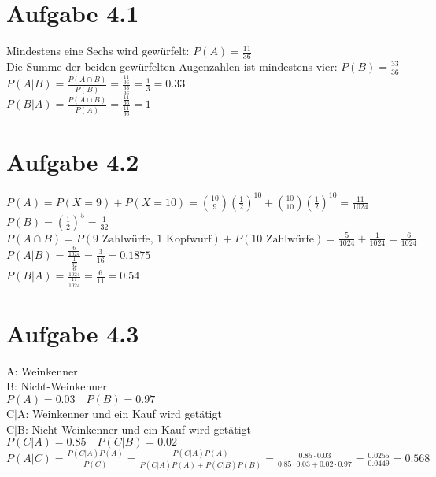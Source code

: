 \documentclass{article}
\begin{document}
	\section*{Aufgabe 4.1}
	Mindestens eine Sechs wird gewürfelt: $P(A) = \frac{11}{36}$ \\
	\newline
	Die Summe der beiden gewürfelten Augenzahlen ist mindestens vier: $P(B) = \frac{33}{36}$ \\
	\newline
	$P(A | B) = \frac{P(A \cap B)}{P(B)} = \frac{\frac{11}{36}}{\frac{33}{36}} = \frac{1}{3} = 0.33$ \\
	\newline
	$P(B | A) = \frac{P(A \cap B)}{P(A)} = \frac{\frac{11}{36}}{\frac{11}{36}} = 1$
	
	\section*{Aufgabe 4.2}
	$P(A) = P(X=9) + P(X=10) = \binom{10}{9}(\frac{1}{2})^{10} + \binom{10}{10}(\frac{1}{2})^{10} = \frac{11}{1024}$ \\
	\newline
	$P(B) = (\frac{1}{2})^5 = \frac{1}{32}$ \\
	\newline
	$P(A \cap B) = P(\text{9  Zahlwürfe, 1 Kopfwurf}) + P(\text{10  Zahlwürfe}) = \frac{5}{1024} + \frac{1}{1024} = \frac{6}{1024}$ \\
	\newline
	$P(A|B) = \frac{\frac{6}{1024}}{\frac{1}{32}} = \frac{3}{16} = 0.1875$ \\
	\newline
	$P(B|A) = \frac{\frac{6}{1024}}{\frac{11}{1024}} = \frac{6}{11} = 0.54$
	
	\section*{Aufgabe 4.3}
	A: Weinkenner \\
	B: Nicht-Weinkenner \\
	\newline
	$P(A) = 0.03 \quad P(B) = 0.97$ \\
	\newline
	C$|$A: Weinkenner und ein Kauf wird getätigt \\
	C$|$B: Nicht-Weinkenner und ein Kauf wird getätigt \\
	\newline
	$P(C|A) = 0.85 \quad P(C|B) = 0.02$	\\
	\newline
	$P(A|C) = \frac{P(C|A)P(A)}{P(C)} = \frac{P(C|A)P(A)}{P(C|A)P(A) + P(C|B)P(B)} = \frac{0.85 \cdot 0.03}{0.85 \cdot 0.03 + 0.02 \cdot 0.97} = \frac{0.0255}{0.0449} = 0.568$
	
\end{document}
